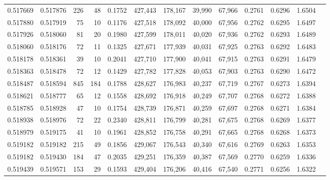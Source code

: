 \begin{tabular}{rrrrrrrrrrrrr}
0.517669 & 0.517876 &   226 &  48 &                                     0.1752 & 427,443 & 178,167 &  39,990 &  67,966 & 0.2761 & 0.6296 & 1.6504 \\
0.517880 & 0.517919 &    75 &  10 &                                     0.1176 & 427,518 & 178,092 &  40,000 &  67,956 & 0.2762 & 0.6295 & 1.6497 \\
0.517926 & 0.518060 &    81 &  20 &                                     0.1980 & 427,599 & 178,011 &  40,020 &  67,936 & 0.2762 & 0.6293 & 1.6489 \\
0.518060 & 0.518176 &    72 &  11 &                                     0.1325 & 427,671 & 177,939 &  40,031 &  67,925 & 0.2763 & 0.6292 & 1.6483 \\
0.518178 & 0.518361 &    39 &  10 &                                     0.2041 & 427,710 & 177,900 &  40,041 &  67,915 & 0.2763 & 0.6291 & 1.6479 \\
0.518363 & 0.518478 &    72 &  12 &                                     0.1429 & 427,782 & 177,828 &  40,053 &  67,903 & 0.2763 & 0.6290 & 1.6472 \\
0.518487 & 0.518594 &   845 & 184 &                                     0.1788 & 428,627 & 176,983 &  40,237 &  67,719 & 0.2767 & 0.6273 & 1.6394 \\
0.518621 & 0.518777 &    65 &  12 &                                     0.1558 & 428,692 & 176,918 &  40,249 &  67,707 & 0.2768 & 0.6272 & 1.6388 \\
0.518785 & 0.518928 &    47 &  10 &                                     0.1754 & 428,739 & 176,871 &  40,259 &  67,697 & 0.2768 & 0.6271 & 1.6384 \\
0.518938 & 0.518976 &    72 &  22 &                                     0.2340 & 428,811 & 176,799 &  40,281 &  67,675 & 0.2768 & 0.6269 & 1.6377 \\
0.518979 & 0.519175 &    41 &  10 &                                     0.1961 & 428,852 & 176,758 &  40,291 &  67,665 & 0.2768 & 0.6268 & 1.6373 \\
0.519182 & 0.519182 &   215 &  49 &                                     0.1856 & 429,067 & 176,543 &  40,340 &  67,616 & 0.2769 & 0.6263 & 1.6353 \\
0.519182 & 0.519430 &   184 &  47 &                                     0.2035 & 429,251 & 176,359 &  40,387 &  67,569 & 0.2770 & 0.6259 & 1.6336 \\
0.519439 & 0.519571 &   153 &  29 &                                     0.1593 & 429,404 & 176,206 &  40,416 &  67,540 & 0.2771 & 0.6256 & 1.6322 \\

\end{tabular}
